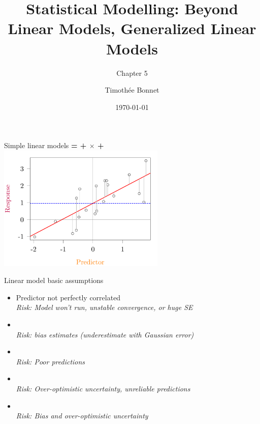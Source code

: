 \documentclass[10pt]{beamer}
\title{Statistical Modelling: Beyond Linear Models, Generalized Linear Models}
\subtitle{Chapter 5}
\author{Timoth\'ee Bonnet}
\date{\today}
\begin{document}



\begin{frame}{}
\maketitle

\end{frame}

\begin{frame}{Simple linear models}
  \textbf{{\color{purple}{Response}} = {\color{blue}{Intercept}} + {\color{red}{Slope}} $\times$ {\color{orange}{Predictor}} + {\color{gray}{Error}}} \\

\centering
\includegraphics[width=0.6\textwidth]{Figures/figure/lmprinc-1}
\end{frame}


\begin{frame}{Linear model basic assumptions}
 \begin{block}{}
     \begin{itemize}
      \item Predictor not perfectly correlated \\ \textit{Risk: Model won't run, unstable convergence, or huge SE}
       \item {\color{red!20!black}{Little error in predictors}}\\ \textit{Risk: bias estimates (underestimate with Gaussian error)}
       \item {\color{red!50!black}{Gaussian error distribution}}\\ \textit{Risk: Poor predictions}
       \item {\color{red!70!black}{Homoscedasticity (constant error variance)}}\\ \textit{Risk: Over-optimistic uncertainty, unreliable predictions}
       \item {\color{red!99!black}{Independence of error}}\\ \textit{Risk: Bias and over-optimistic uncertainty}
     \end{itemize}
 \end{block}
\end{frame}
\end{document}
